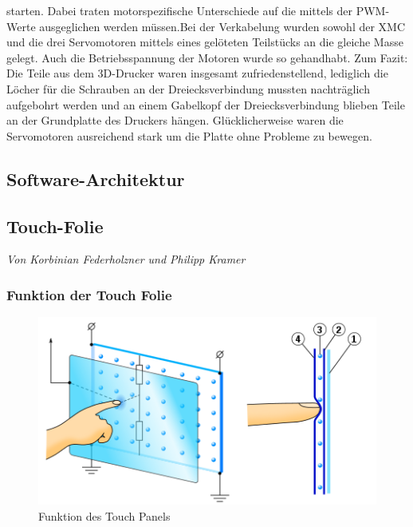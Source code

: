 \documentclass[12pt,a4paper,bibliography=totoc,listof=totoc]{scrartcl}
\begin{document}
starten. Dabei traten motorspezifische Unterschiede auf die mittels der PWM-Werte ausgeglichen werden 
müssen.Bei der Verkabelung wurden sowohl der XMC und die drei Servomotoren mittels eines gelöteten 
Teilstücks an die gleiche Masse gelegt. Auch die Betriebsspannung der Motoren wurde so gehandhabt.
Zum Fazit:
Die Teile aus dem 3D-Drucker waren insgesamt zufriedenstellend, lediglich die Löcher für die Schrauben 
an der Dreiecksverbindung mussten nachträglich aufgebohrt werden und an einem Gabelkopf der 
Dreiecksverbindung blieben Teile an der Grundplatte des Druckers hängen. Glücklicherweise waren die 
Servomotoren ausreichend stark um die Platte ohne Probleme zu bewegen.

\subsection{Software-Architektur}

\subsection{Touch-Folie}
\textit{Von Korbinian Federholzner und Philipp Kramer}\newline
\subsubsection{Funktion der Touch Folie}

\begin{figure}[htbp]
	\centering
	\includegraphics[scale = 0.6]{pics/TouchScreen_5wires.png}
	\caption{Funktion des Touch Panels} 
	\label{fig:TouchPanelFunction}
\end{figure}
\end{document}
